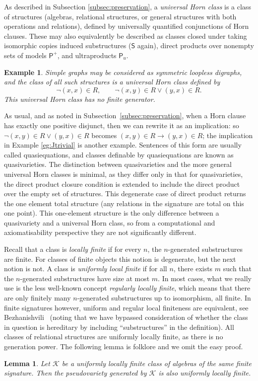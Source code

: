 \documentclass[reqno]{amsart}
\theoremstyle{plain}
\newtheorem{lem}[thm]{Lemma}
\newtheorem{example}[thm]{Example}
\theoremstyle{definition}
\begin{document}
  
As described in Subsection \ref{subsec:preservation}, a \emph{universal Horn class} is a class of structures (algebras, relational structures, or general structures with both operations and relations), defined by universally quantified conjunctions of Horn clauses.
These may also equivalently be described as classes closed under taking  isomorphic copies induced substructures ($\mathsf{S}$ again), direct products over nonempty sets of models $\mathsf{P}^+$, and ultraproducts $\mathsf{P}_u$.
\begin{example}
Simple graphs may be considered as symmetric loopless digraphs, and the class of all such structures is a universal Horn class defined by 
\[
\neg (x,x)\in R,\qquad \neg (x,y)\in R\vee (y,x)\in R.
\]
This universal Horn class has no finite generator.
\end{example}
As usual, and as noted in Subsection~\ref{subsec:preservation}, when a Horn clause has exactly one positive disjunct, then we can rewrite it as an implication: so $\neg (x,y)\in R\vee (y,x)\in R$ becomes $(x,y)\in R\rightarrow (y,x)\in R$; the implication in Example \ref{eg:Jtrivial} is another example.  
Sentences of this form are usually called quasiequations, and classes definable by quasiequations are known as quasivarieties.
The distinction between quasivarieties and the more general universal Horn classes is minimal, as they differ only in that for quasivarieties, the direct product closure condition is extended to include the direct product over the empty set of structures.
This degenerate case of direct product returns the one element total structure (any relations in the signature are total on this one point).  
This one-element structure is the only difference between a quasivariety and a universal Horn class, so from a computational and axiomatisability perspective they are not significantly different.

Recall that a class is \emph{locally finite} if for every $n$, the $n$-generated substructures are finite.  
For classes of finite objects this notion is degenerate, but the next notion is not.
A class is \emph{uniformly local finite} if for all $n$, there exists $m$ such that the $n$-generated substructures have size at most $m$.  
In most cases, what we really use is the less well-known concept \emph{regularly locally finite}, which means that there are only finitely many $n$-generated substructures up to isomorphism, all finite.  In finite signatures however, uniform and regular local finiteness are equivalent, see Bezhanishvili~\cite{bez} (noting that we have bypassed consideration of whether the class in question is hereditary by including ``substructures'' in the definition).
All classes of relational structures are uniformly locally finite, as there is no generation power.  
The following lemma is folklore and we omit the easy proof.
\begin{lem}
Let $\mathscr{K}$ be a uniformly locally finite class of algebras of the same finite signature.  
Then the pseudovariety generated by $\mathscr{K}$ is also uniformly locally finite.
\end{lem}
\end{document}
